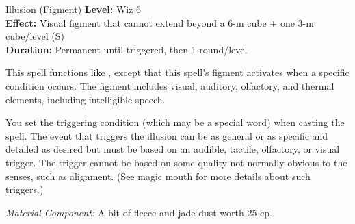 {Illusion (Figment)}
{
	\textbf{Level:}
	Wiz 6\\
	\textbf{Effect:}
	Visual figment that cannot extend beyond a 6-m cube + one 3-m cube/level (S)\\
	\textbf{Duration:}
	Permanent until triggered, then 1 round/level\\
}
{
	This spell functions like , except that this spell's figment activates when a specific condition occurs. The figment includes visual, auditory, olfactory, and thermal elements, including intelligible speech.

	You set the triggering condition (which may be a special word) when casting the spell. The event that triggers the illusion can be as general or as specific and detailed as desired but must be based on an audible, tactile, olfactory, or visual trigger. The trigger cannot be based on some quality not normally obvious to the senses, such as alignment. (See magic mouth for more details about such triggers.)

	\textit{Material Component:}
	A bit of fleece and jade dust worth 25 cp.

}
